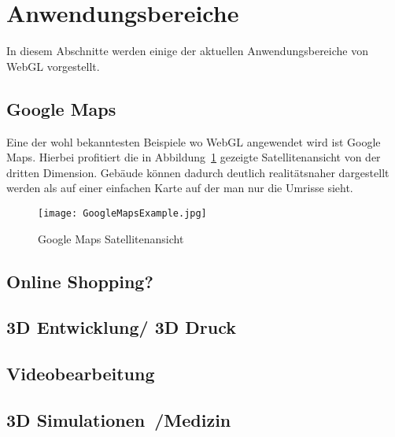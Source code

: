 \section{Anwendungsbereiche}
In diesem Abschnitte werden einige der aktuellen Anwendungsbereiche von WebGL vorgestellt.
\subsection{Google Maps}
Eine der wohl bekanntesten Beispiele wo WebGL angewendet wird ist Google Maps.
Hierbei profitiert die in Abbildung~\ref{fig:GoogleMaps} gezeigte Satellitenansicht von der dritten Dimension.
Gebäude können dadurch deutlich realitätsnaher dargestellt werden als auf einer einfachen Karte auf der man nur die Umrisse sieht.
\begin{figure}
    \centering
    \texttt{[image: GoogleMapsExample.jpg]}
    \caption{Google Maps Satellitenansicht\cite{GoogleMaps}} \label{fig:GoogleMaps}
    \end{figure}

\subsection{Online Shopping?~\cite{WebGLExamples2}}
\subsection{3D Entwicklung/ 3D Druck}
\subsection{Videobearbeitung}
\subsection{3D Simulationen~\cite{BioDigital}/Medizin}